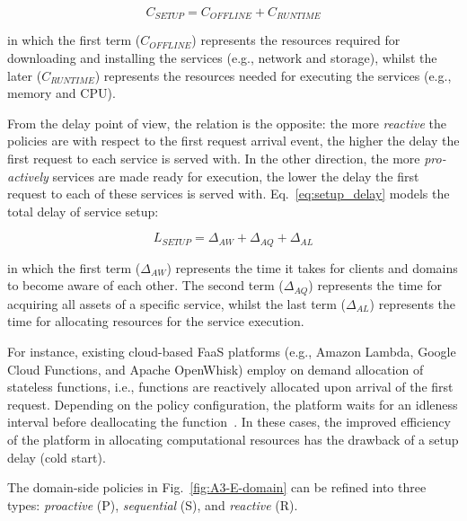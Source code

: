 \begin{equation}\label{eq:setup_cost}
C_{SETUP} = C_{OFFLINE} + C_{RUNTIME}
\end{equation}

\noindent
in which the first term ($C_{OFFLINE}$) represents the resources required for downloading and installing the services (e.g., network and storage), whilst the later ($C_{RUNTIME}$) represents the resources needed for executing the services (e.g., memory and CPU). 

From the delay point of view, the relation is the opposite: the more \textit{reactive} the policies are with respect to the first request arrival event, the higher the delay the first request to each service is served with. In the other direction, the more \textit{pro-actively} services are made ready for execution, the lower the delay the first request to each of these services is served with. Eq.~\ref{eq:setup_delay} models the total delay of service setup:

\begin{equation}\label{eq:setup_delay}
L_{SETUP} = \Delta_{AW} + \Delta_{AQ} + \Delta_{AL}
\end{equation}

\noindent
in which the first term ($\Delta_{AW}$) represents the time it takes for clients and domains to become aware of each other. The second term ($\Delta_{AQ}$) represents the time for acquiring all assets of a specific service, whilst the last term ($\Delta_{AL}$) represents the time for allocating resources for the service execution. 

For instance, existing cloud-based FaaS platforms (e.g., Amazon Lambda, Google Cloud Functions, and Apache OpenWhisk) employ on demand allocation of stateless functions, i.e., functions are reactively allocated upon arrival of the first request. Depending on the policy configuration, the platform waits for an idleness interval before deallocating the function~\cite{}. In these cases, the improved efficiency of the platform in allocating computational resources has the drawback of a setup delay (cold start). 

The domain-side policies in Fig.~\ref{fig:A3-E-domain} can be refined into three types: \textit{proactive} (P), \textit{sequential} (S), and \textit{reactive} (R). 

